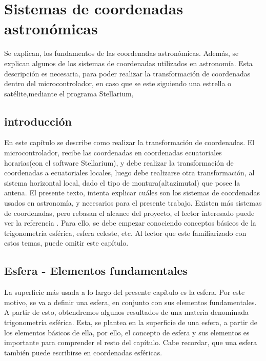 \renewcommand{\chaptername}{Sistemas de coordenadas astronómicas}
\chapter{Sistemas de coordenadas astronómicas} \label{cap:sist_cord} 
\begin{center}
	\begin{tcolorbox}[colback=gray!5!white, %
		colframe=blue!75!black,
		title= \center{\Large{Resumen}} ]
	Se explican, los fundamentos de las coordenadas astronómicas. Además, se explican algunos de los sistemas de coordenadas utilizados en astronomía. Esta descripción es necesaria, para poder realizar la transformación de coordenadas dentro del microcontrolador, en caso que se este siguiendo una estrella o satélite,mediante el programa Stellarium,
	\end{tcolorbox}
\end{center}    

\section{introducción} 

En este capítulo se describe como realizar la transformación de coordenadas. El microcontrolador, recibe las coordenadas en coordenadas ecuatoriales horarias(con el software Stellarium), y debe realizar la transformación de coordenadas a ecuatoriales locales, luego debe realizarse otra transformación, al sistema horizontal local, dado el tipo de montura(altazimutal) que posee la antena. El presente texto, intenta explicar cuáles son los sistemas de coordenadas usados en astronomía, y necesarios para el presente trabajo. Existen más sistemas de coordenadas, pero rebasan el alcance del proyecto, el lector interesado puede ver la referencia \cite{Baume2014}. Para ello, se debe empezar conociendo conceptos básicos de la trigonometría esférica, esfera celeste, etc. Al lector que este familiarizado con estos temas, puede omitir este capítulo. 

\section{Esfera - Elementos fundamentales} 


La superficie más usada a lo largo del presente capítulo es la esfera. Por este motivo, se va a definir una esfera, en conjunto con sus elementos fundamentales. A partir de esto, obtendremos algunos resultados de una materia denominada trigonometría esférica. Esta, se plantea en la superficie de una esfera, a partir de los elementos básicos de ella, por ello, el concepto de esfera y sus elementos es importante para comprender el resto del capítulo. Cabe recordar, que una esfera también puede escribirse en coordenadas esféricas.  

